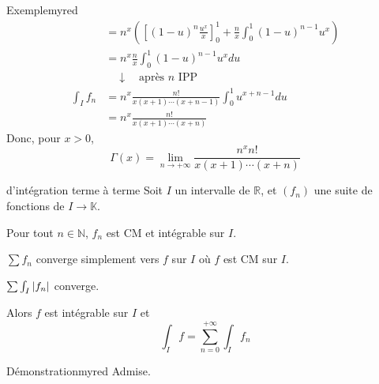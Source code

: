 \begin{omed}{Exemple}{myred}
\begin{align*}
            &= n^x \left( \left[(1-u)^n \frac{u^x}{x}\right]^1_0 + \frac{n}{x} \int_{0}^{1} (1-u)^{n-1} u^x \right) \\
            &= n^x \frac{n}{x} \int_{0}^{1} (1-u)^{n-1} u^x du \\
            &\quad \downarrow \quad \text{après } n \text{ IPP} \\
            \int_I f_n 
            &= n^x \frac{n!}{x(x+1) \cdots (x+n-1)} \int_{0}^{1} u^{x + n -1} du \\
            &= n^x \frac{n!}{x(x+1) \cdots (x+n)} 
        \end{align*}
        Donc, pour $x > 0$, 
        \[ \Gamma(x) = \lim_{n \to +\infty} \frac{n^x n!}{x(x+1) \cdots (x+n)} \]   
    \end{omed}

    \begin{theo}{d’intégration terme à terme}
        Soit $I$ un intervalle de $\mathbb{R}$, et $(f_n)$ une suite de fonctions de $I \to \mathbb{K}$. \begin{suppose}
            \item Pour tout $n \in \mathbb{N}$, $f_n$ est CM et intégrable sur $I$.
            \item $\sum f_n$ converge simplement vers $f$ sur $I$ où $f$ est CM sur $I$.
            \item $\sum \int_I \left\lvert f_n\right\rvert$ converge.
        \end{suppose}
        Alors $f$ est intégrable sur $I$ et 
        \[ \int_I f = \sum_{n=0}^{+\infty} \int_I f_n \]   
    \end{theo}

    \begin{demo}{Démonstration}{myred}
        Admise.
    \end{demo}


